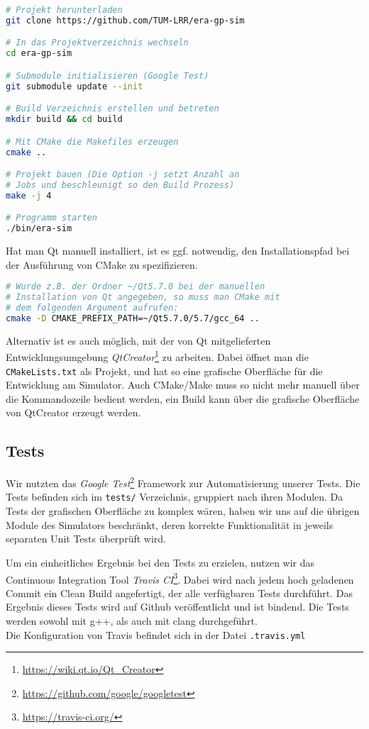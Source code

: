 \begin{lstlisting}[language=bash, keywords={}]
# Projekt herunterladen
git clone https://github.com/TUM-LRR/era-gp-sim

# In das Projektverzeichnis wechseln
cd era-gp-sim

# Submodule initialisieren (Google Test)
git submodule update --init

# Build Verzeichnis erstellen und betreten
mkdir build && cd build

# Mit CMake die Makefiles erzeugen
cmake ..

# Projekt bauen (Die Option -j setzt Anzahl an
# Jobs und beschleunigt so den Build Prozess)
make -j 4

# Programm starten
./bin/era-sim
\end{lstlisting}

Hat man Qt manuell installiert, ist es ggf. notwendig, den Installationspfad bei der
Ausführung von CMake zu spezifizieren.

\begin{lstlisting}[language=bash, keywords={}]
# Wurde z.B. der Ordner ~/Qt5.7.0 bei der manuellen
# Installation von Qt angegeben, so muss man CMake mit
# dem folgenden Argument aufrufen:
cmake -D CMAKE_PREFIX_PATH=~/Qt5.7.0/5.7/gcc_64 ..
\end{lstlisting}

Alternativ ist es auch möglich, mit der von Qt mitgelieferten Entwicklungsumgebung
\textit{QtCreator}\footnote{\url{https://wiki.qt.io/Qt_Creator}} zu arbeiten.
Dabei öffnet man die \texttt{CMakeLists.txt} als Projekt, und hat so eine grafische
Oberfläche für die Entwicklung am Simulator. Auch CMake/Make muss so nicht mehr
manuell über die Kommandozeile bedient werden, ein Build kann über die grafische
Oberfläche von QtCreator erzeugt werden.

\subsection{Tests}

Wir nutzten das \textit{Google Test}\footnote{\url{https://github.com/google/googletest}} Framework
zur Automatisierung unserer Tests. Die Tests befinden sich im \texttt{tests/} Verzeichnis, gruppiert
nach ihren Modulen. Da Tests der grafischen Oberfläche zu komplex wären, haben wir uns auf die übrigen
Module des Simulators beschränkt, deren korrekte Funktionalität in jeweils separaten Unit Tests
überprüft wird.

Um ein einheitliches Ergebnis bei den Tests zu erzielen, nutzen wir das Continuous Integration Tool
\textit{Travis CI}\footnote{\url{https://travis-ci.org/}}. Dabei wird nach jedem hoch geladenen
Commit ein Clean Build angefertigt, der alle verfügbaren Tests durchführt. Das Ergebnis dieses Tests
wird auf Github veröffentlicht und ist bindend. Die Tests werden sowohl mit g++, als auch mit clang
durchgeführt. \\
Die Konfiguration von Travis befindet sich in der Datei \texttt{.travis.yml}

